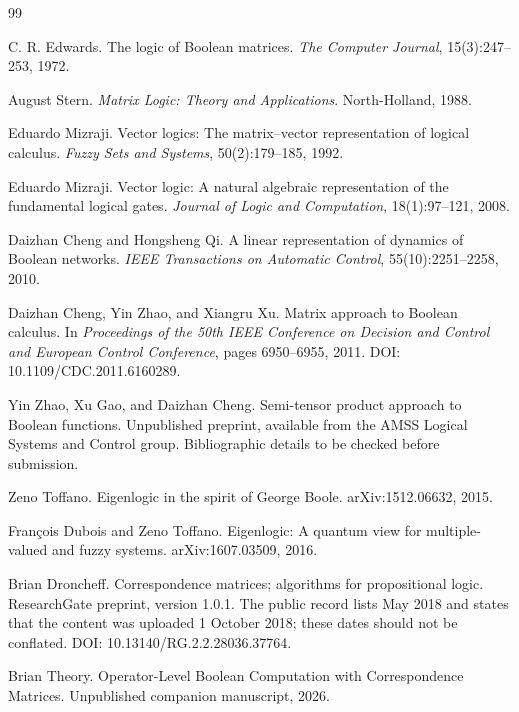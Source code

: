 \documentclass[11pt]{article}
\theoremstyle{definition}
\theoremstyle{remark}
\begin{document}
\begin{thebibliography}{99}

C. R. Edwards.
\newblock The logic of Boolean matrices.
\newblock \emph{The Computer Journal}, 15(3):247--253, 1972.

August Stern.
\newblock \emph{Matrix Logic: Theory and Applications}.
\newblock North-Holland, 1988.

Eduardo Mizraji.
\newblock Vector logics: The matrix--vector representation of logical calculus.
\newblock \emph{Fuzzy Sets and Systems}, 50(2):179--185, 1992.

Eduardo Mizraji.
\newblock Vector logic: A natural algebraic representation of the fundamental logical gates.
\newblock \emph{Journal of Logic and Computation}, 18(1):97--121, 2008.

Daizhan Cheng and Hongsheng Qi.
\newblock A linear representation of dynamics of Boolean networks.
\newblock \emph{IEEE Transactions on Automatic Control}, 55(10):2251--2258, 2010.

Daizhan Cheng, Yin Zhao, and Xiangru Xu.
\newblock Matrix approach to Boolean calculus.
\newblock In \emph{Proceedings of the 50th IEEE Conference on Decision and Control and European Control Conference}, pages 6950--6955, 2011.
\newblock DOI: 10.1109/CDC.2011.6160289.

Yin Zhao, Xu Gao, and Daizhan Cheng.
\newblock Semi-tensor product approach to Boolean functions.
\newblock Unpublished preprint, available from the AMSS Logical Systems and Control group.  Bibliographic details to be checked before submission.

Zeno Toffano.
\newblock Eigenlogic in the spirit of George Boole.
\newblock arXiv:1512.06632, 2015.

Fran\c{c}ois Dubois and Zeno Toffano.
\newblock Eigenlogic: A quantum view for multiple-valued and fuzzy systems.
\newblock arXiv:1607.03509, 2016.

Brian Droncheff.
\newblock Correspondence matrices; algorithms for propositional logic.
\newblock ResearchGate preprint, version 1.0.1.  The public record lists May 2018 and states that the content was uploaded 1 October 2018; these dates should not be conflated.
\newblock DOI: 10.13140/RG.2.2.28036.37764.

Brian Theory.
\newblock Operator-Level Boolean Computation with Correspondence Matrices.
\newblock Unpublished companion manuscript, 2026.


\end{thebibliography}
\end{document}
